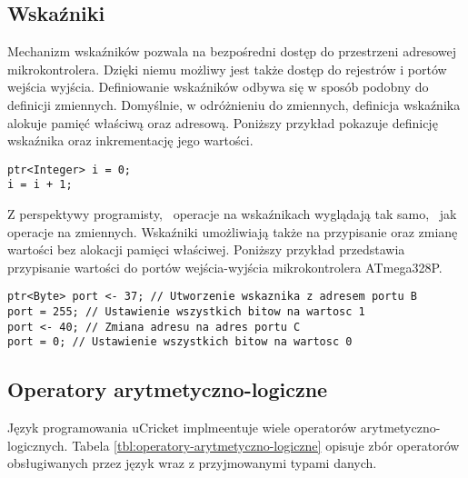 \subsection{Wskaźniki}
Mechanizm wskaźników pozwala na bezpośredni dostęp do przestrzeni adresowej mikrokontrolera. Dzięki niemu możliwy jest także dostęp do rejestrów i portów wejścia wyjścia.
Definiowanie wskaźników odbywa się w sposób podobny do definicji zmiennych. Domyślnie, w odróżnieniu do zmiennych, definicja wskaźnika alokuje pamięć właściwą oraz adresową. Poniższy przykład pokazuje definicję wskaźnika oraz inkrementację jego wartości.
\begin{lstlisting}
ptr<Integer> i = 0;
i = i + 1;
\end{lstlisting}
Z perspektywy programisty, \nocomma\ operacje na wskaźnikach wyglądają tak samo, \nocomma\ jak operacje na zmiennych.
Wskaźniki umożliwiają także na przypisanie oraz zmianę wartości bez alokacji pamięci właściwej. Poniższy przykład przedstawia przypisanie wartości do portów wejścia-wyjścia mikrokontrolera ATmega328P.
\begin{lstlisting}
ptr<Byte> port <- 37; // Utworzenie wskaznika z adresem portu B
port = 255; // Ustawienie wszystkich bitow na wartosc 1
port <- 40; // Zmiana adresu na adres portu C
port = 0; // Ustawienie wszystkich bitow na wartosc 0
\end{lstlisting}

\subsection{Operatory arytmetyczno-logiczne}
Język programowania uCricket implmeentuje wiele operatorów arytmetyczno-logicznych. Tabela \ref{tbl:operatory-arytmetyczno-logiczne} opisuje zbór operatorów obsługiwanych przez język wraz z przyjmowanymi typami danych.


